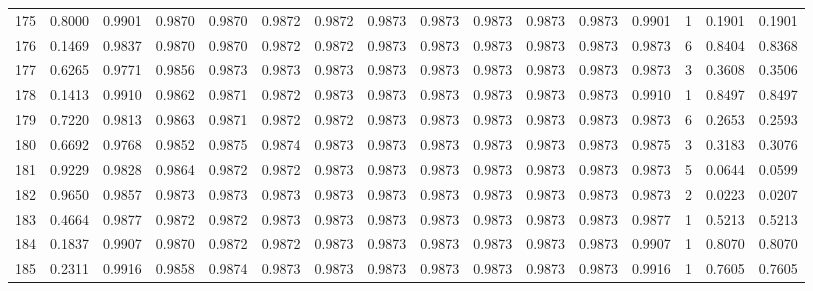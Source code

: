 \begin{tabular}{lrrrrrrrrrrrrrrr}
175 &      0.8000 &  0.9901 &  0.9870 &  0.9870 &  0.9872 &  0.9872 &  0.9873 &  0.9873 &  0.9873 &  0.9873 &   0.9873 &     0.9901 &      1 &                    0.1901 &                     0.1901 \\
176 &      0.1469 &  0.9837 &  0.9870 &  0.9870 &  0.9872 &  0.9872 &  0.9873 &  0.9873 &  0.9873 &  0.9873 &   0.9873 &     0.9873 &      6 &                    0.8404 &                     0.8368 \\
177 &      0.6265 &  0.9771 &  0.9856 &  0.9873 &  0.9873 &  0.9873 &  0.9873 &  0.9873 &  0.9873 &  0.9873 &   0.9873 &     0.9873 &      3 &                    0.3608 &                     0.3506 \\
178 &      0.1413 &  0.9910 &  0.9862 &  0.9871 &  0.9872 &  0.9873 &  0.9873 &  0.9873 &  0.9873 &  0.9873 &   0.9873 &     0.9910 &      1 &                    0.8497 &                     0.8497 \\
179 &      0.7220 &  0.9813 &  0.9863 &  0.9871 &  0.9872 &  0.9872 &  0.9873 &  0.9873 &  0.9873 &  0.9873 &   0.9873 &     0.9873 &      6 &                    0.2653 &                     0.2593 \\
180 &      0.6692 &  0.9768 &  0.9852 &  0.9875 &  0.9874 &  0.9873 &  0.9873 &  0.9873 &  0.9873 &  0.9873 &   0.9873 &     0.9875 &      3 &                    0.3183 &                     0.3076 \\
181 &      0.9229 &  0.9828 &  0.9864 &  0.9872 &  0.9872 &  0.9873 &  0.9873 &  0.9873 &  0.9873 &  0.9873 &   0.9873 &     0.9873 &      5 &                    0.0644 &                     0.0599 \\
182 &      0.9650 &  0.9857 &  0.9873 &  0.9873 &  0.9873 &  0.9873 &  0.9873 &  0.9873 &  0.9873 &  0.9873 &   0.9873 &     0.9873 &      2 &                    0.0223 &                     0.0207 \\
183 &      0.4664 &  0.9877 &  0.9872 &  0.9872 &  0.9873 &  0.9873 &  0.9873 &  0.9873 &  0.9873 &  0.9873 &   0.9873 &     0.9877 &      1 &                    0.5213 &                     0.5213 \\
184 &      0.1837 &  0.9907 &  0.9870 &  0.9872 &  0.9872 &  0.9873 &  0.9873 &  0.9873 &  0.9873 &  0.9873 &   0.9873 &     0.9907 &      1 &                    0.8070 &                     0.8070 \\
185 &      0.2311 &  0.9916 &  0.9858 &  0.9874 &  0.9873 &  0.9873 &  0.9873 &  0.9873 &  0.9873 &  0.9873 &   0.9873 &     0.9916 &      1 &                    0.7605 &                     0.7605 \\

\end{tabular}
